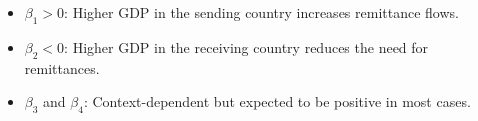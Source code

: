 \documentclass[
  11pt,
]{article}
\providecommand{\tightlist}{%
  \setlength{\itemsep}{0pt}\setlength{\parskip}{0pt}}\usepackage{longtable,booktabs,array}
\begin{document}
\begin{itemize}
\tightlist
\item
  \(\beta_1 > 0\): Higher GDP in the sending country increases
  remittance flows.\\
\item
  \(\beta_2 < 0\): Higher GDP in the receiving country reduces the need
  for remittances.\\
\item
  \(\beta_3\) and \(\beta_4\): Context-dependent but expected to be
  positive in most cases.
\end{itemize}


\printbibliography
\end{document}
